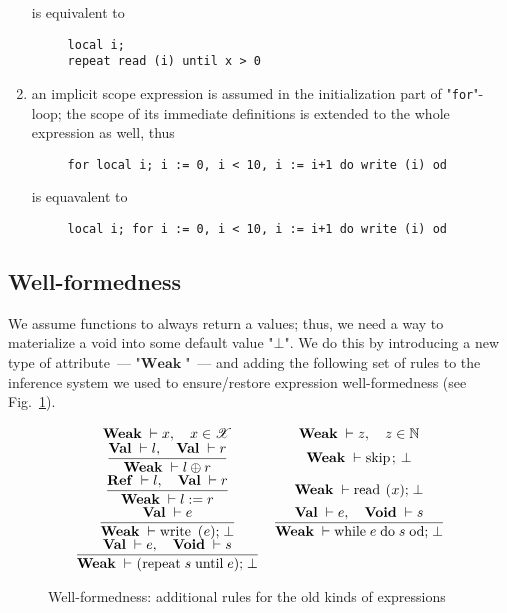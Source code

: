 \documentclass{article}
\newcommand{\trule}[2]{\dfrac{#1}{#2}}
\newcommand{\withenv}[2]{{#1}\vdash{#2}}
\newcommand{\llang}[1]{\mbox{\lstinline[mathescape]|#1|}}
\newcommand{\primi}[2]{\mathbf{#1}\;{#2}}
\theoremstyle{definition}
\begin{document}
\begin{enumerate}
  is equivalent to

  \begin{lstlisting}
     local i;
     repeat read (i) until x > 0
  \end{lstlisting}

\item an implicit scope expression is assumed in the initialization part of "\lstinline|for|"-loop; the scope of its immediate definitions
  is extended to the whole expression as well, thus

  \begin{lstlisting}
     for local i; i := 0, i < 10, i := i+1 do write (i) od
  \end{lstlisting}

  is equavalent to

  \begin{lstlisting}
     local i; for i := 0, i < 10, i := i+1 do write (i) od
  \end{lstlisting}

\end{enumerate}

\subsection{Well-formedness}

\newcommand{\Ref}{\primi{Ref}{}}
\newcommand{\Val}{\primi{Val}{}}
\newcommand{\Void}{\primi{Void}{}}
\newcommand{\Weak}{\primi{Weak}{}}

We assume functions to always return a values; thus, we need a way to materialize a void into some default value "$\bot$".  We
do this by introducing a new type of attribute~--- "$\Weak$"~--- and adding the following set of rules to
the inference system we used to ensure/restore expression well-formedness (see Fig.~\ref{well_formed_old}).

\begin{figure}[h]
\renewcommand{\arraystretch}{2}
\[
  \begin{array}{cc}
    \withenv{\Weak}{x},\quad x \in \mathscr X       & \withenv{\Weak}{z},\quad z \in \mathbb N \\
  \trule{\withenv{\Val}{l},\quad\withenv{\Val}{r}} 
        {\withenv{\Weak}{l\oplus r}}               & \withenv{\Weak}{\llang{skip; $\;\bot$}} \\[2mm]
  \trule{\withenv{\Ref}{l},\quad\withenv{\Val}{r}}
        {\withenv{\Weak}{\llang{$l\;$ := $\; r$}}} & \withenv{\Weak}{\llang{read ($x$); $\;\bot$}} \\[2mm]
  \trule{\withenv{\Val}{e}}{\withenv{\Weak}{\llang{write ($e$); $\;\bot$}}} & \trule{\withenv{\Val}{e},\quad\withenv{\Void}{s}}{\withenv{\Weak}{\llang{while $\;e\;$ do $\;s\;$ od; $\;\bot$}}} \\[2mm]
  \trule{\withenv{\Val}{e},\quad\withenv{\Void}{s}}{\withenv{\Weak}{\llang{(repeat $\;s\;$ until $\;e$); $\;\bot$ }}} & 
  \end{array}
  \]
  \caption{Well-formedness: additional rules for the old kinds of expressions}
  \label{well_formed_old}  
\end{figure}
\end{document}

